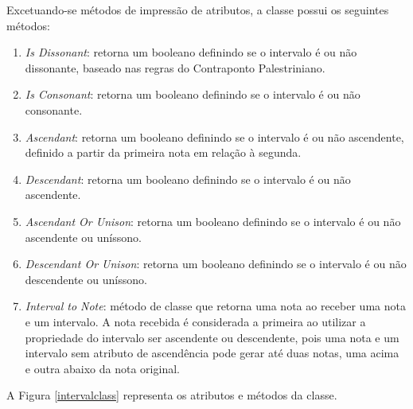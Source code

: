       Excetuando-se métodos de impressão de atributos, a classe possui os seguintes métodos:

      \begin{enumerate}
        \item \textit{Is Dissonant}: retorna um booleano definindo se o intervalo é ou não dissonante, baseado nas regras do Contraponto Palestriniano.
        \item \textit{Is Consonant}: retorna um booleano definindo se o intervalo é ou não consonante.
        \item \textit{Ascendant}: retorna um booleano definindo se o intervalo é ou não ascendente, definido a partir da primeira nota em relação à segunda.
        \item \textit{Descendant}: retorna um booleano definindo se o intervalo é ou não ascendente.
        \item \textit{Ascendant Or Unison}: retorna um booleano definindo se o intervalo é ou não ascendente ou uníssono.
        \item \textit{Descendant Or Unison}: retorna um booleano definindo se o intervalo é ou não descendente ou uníssono.
        \item \textit{Interval to Note}: método de classe que retorna uma nota ao receber uma nota e um intervalo. A nota recebida é considerada a primeira ao utilizar a propriedade do intervalo ser ascendente ou descendente, pois uma nota e um intervalo sem atributo de ascendência pode gerar até duas notas, uma acima e outra abaixo da nota original.
      \end{enumerate}

      A Figura \ref{intervalclass} representa os atributos e métodos da classe.

